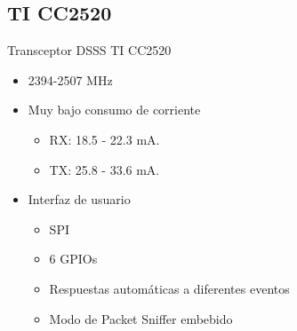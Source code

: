 \documentclass[aspectratio=169, handout]{beamer}
\begin{document}
\subsection[TI CC2520]{TI CC2520}
\begin{frame}{Transceptor DSSS TI CC2520} 
\begin{minipage}[c]{1.0\linewidth}
	\begin{minipage}[c]{0.7\linewidth}
		\begin{itemize}
			\vspace{5px}
			\item 2394-2507 MHz	
			\vspace{10px}
			\item Muy bajo consumo de corriente
			\begin{itemize}
				\item RX: 18.5 - 22.3 mA.
				\item TX: 25.8 - 33.6 mA.
			\end{itemize}
			\vspace{10px}
			\item Interfaz de usuario
			\begin{itemize}
				\item SPI
				\item 6 GPIOs
				\item Respuestas automáticas a diferentes eventos
				\item Modo de Packet Sniffer embebido
			\end{itemize}
			\vspace{10px}
		\end{itemize}
	\end{minipage}
	\begin{minipage}[c]{0.25\linewidth}
		\begin{figure}[H]
		\end{figure}	  	  	
	\end{minipage}
\end{minipage}
\end{frame}
\end{document}
